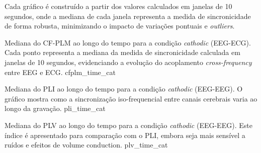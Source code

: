
Cada gráfico é construído a partir dos valores calculados em janelas de 10 segundos, onde a mediana de cada janela representa a medida de sincronicidade de forma robusta, minimizando o impacto de variações pontuais e \textit{outliers}.

{Mediana do CF-PLM ao longo do tempo para a condição \textit{cathodic} (EEG-ECG). Cada ponto representa a mediana da medida de sincronicidade calculada em janelas de 10 segundos, evidenciando a evolução do acoplamento \textit{cross-frequency} entre EEG e ECG.}
{cfplm_time_cat}

{Mediana do PLI ao longo do tempo para a condição \textit{cathodic} (EEG-EEG). O gráfico mostra como a sincronização iso-frequencial entre canais cerebrais varia ao longo da gravação.}
{pli_time_cat}

{Mediana do PLV ao longo do tempo para a condição \textit{cathodic} (EEG-EEG). Este índice é apresentado para comparação com o PLI, embora seja mais sensível a ruídos e efeitos de volume conduction.}
{plv_time_cat}
